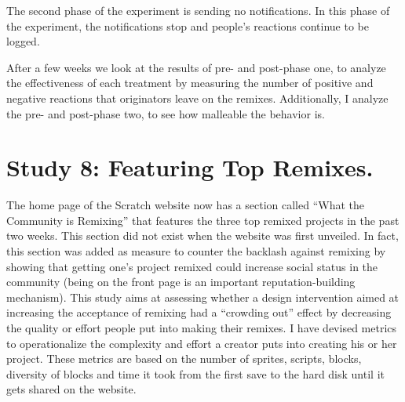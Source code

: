 The second phase of the experiment is sending no notifications. In this phase of the experiment, the notifications stop and people's reactions continue to be logged.

After a few weeks we look at the results of pre- and post-phase one, to analyze the effectiveness of each treatment by measuring the number of positive and negative reactions that originators leave on the remixes. 
Additionally, I analyze the pre- and post-phase two, to see how malleable the behavior is.

\section{Study 8: Featuring Top Remixes.}
The home page of the Scratch website now has a section called ``What the Community is Remixing''  that features the three top remixed projects in the past two weeks.
This section did not exist when the website was first unveiled.
In fact, this section was added as measure to counter the backlash against remixing by showing that getting one's project remixed could increase social status in the community (being on the front page is an important reputation-building mechanism).
This study aims at assessing whether a design intervention aimed at increasing the acceptance of remixing had a ``crowding out'' effect by decreasing the quality or effort people put into making their remixes.
I have devised metrics to operationalize the complexity and effort a creator puts into creating his or her project. These metrics are based on the number of sprites, scripts, blocks, diversity of blocks and time it took from the first save to the hard disk until it gets shared on the website.

